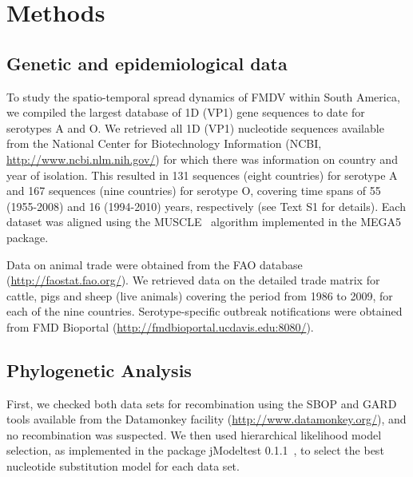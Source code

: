 \documentclass[10pt]{article}
\begin{document}
\section*{Methods}

\subsection*{Genetic and epidemiological data}

To study the spatio-temporal spread dynamics of FMDV within South America, we compiled the largest database of 1D (VP1) gene sequences to date for serotypes A and O.
We retrieved all 1D (VP1) nucleotide sequences available from the National Center for Biotechnology Information (NCBI, \url{ http://www.ncbi.nlm.nih.gov/}) for which there was information on country and year of isolation.
This resulted in 131 sequences (eight countries) for serotype A and 167 sequences (nine countries) for serotype O, covering time spans of 55 (1955-2008) and 16 (1994-2010) years, respectively (see Text S1 for details).
Each dataset was aligned using the MUSCLE~\cite{muscle} algorithm implemented in the MEGA5~\cite{MEGA} package.

Data on animal trade were obtained from the FAO database (\url{http://faostat.fao.org/}).
We retrieved data on the detailed trade matrix for cattle, pigs and sheep (live animals) covering the period from 1986 to 2009, for each of the nine countries.
Serotype-specific outbreak notifications were obtained from FMD Bioportal (\url{http://fmdbioportal.ucdavis.edu:8080/}).

\subsection*{Phylogenetic Analysis}

First, we checked both data sets for recombination using the SBOP and GARD~\cite{sbpgard} tools available from the Datamonkey facility (\url{http://www.datamonkey.org/}), and no recombination was suspected.
We then used hierarchical likelihood model selection, as implemented in the package jModeltest 0.1.1~\cite{jmodel}, to select the best nucleotide substitution model for each data set.
\end{document}
